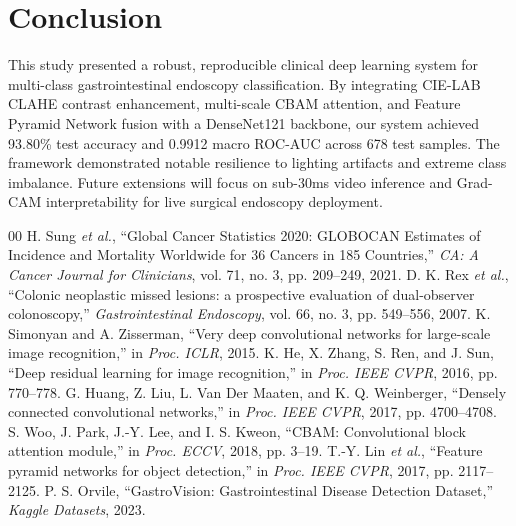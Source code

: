 \documentclass[conference]{IEEEtran}
\begin{document}
\section{Conclusion}
This study presented a robust, reproducible clinical deep learning system for multi-class gastrointestinal endoscopy classification. By integrating CIE-LAB CLAHE contrast enhancement, multi-scale CBAM attention, and Feature Pyramid Network fusion with a DenseNet121 backbone, our system achieved 93.80\% test accuracy and 0.9912 macro ROC-AUC across 678 test samples. The framework demonstrated notable resilience to lighting artifacts and extreme class imbalance. Future extensions will focus on sub-30ms video inference and Grad-CAM interpretability for live surgical endoscopy deployment.

\begin{thebibliography}{00}
 H. Sung \textit{et al.}, ``Global Cancer Statistics 2020: GLOBOCAN Estimates of Incidence and Mortality Worldwide for 36 Cancers in 185 Countries,'' \textit{CA: A Cancer Journal for Clinicians}, vol. 71, no. 3, pp. 209--249, 2021.
 D. K. Rex \textit{et al.}, ``Colonic neoplastic missed lesions: a prospective evaluation of dual-observer colonoscopy,'' \textit{Gastrointestinal Endoscopy}, vol. 66, no. 3, pp. 549--556, 2007.
 K. Simonyan and A. Zisserman, ``Very deep convolutional networks for large-scale image recognition,'' in \textit{Proc. ICLR}, 2015.
 K. He, X. Zhang, S. Ren, and J. Sun, ``Deep residual learning for image recognition,'' in \textit{Proc. IEEE CVPR}, 2016, pp. 770--778.
 G. Huang, Z. Liu, L. Van Der Maaten, and K. Q. Weinberger, ``Densely connected convolutional networks,'' in \textit{Proc. IEEE CVPR}, 2017, pp. 4700--4708.
 S. Woo, J. Park, J.-Y. Lee, and I. S. Kweon, ``CBAM: Convolutional block attention module,'' in \textit{Proc. ECCV}, 2018, pp. 3--19.
 T.-Y. Lin \textit{et al.}, ``Feature pyramid networks for object detection,'' in \textit{Proc. IEEE CVPR}, 2017, pp. 2117--2125.
 P. S. Orvile, ``GastroVision: Gastrointestinal Disease Detection Dataset,'' \textit{Kaggle Datasets}, 2023.
\end{thebibliography}
\end{document}
